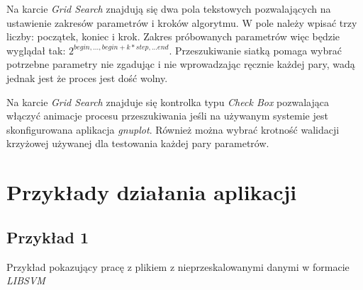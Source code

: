 \documentclass[paper=a4, fontsize=11pt]{scrartcl} %
\numberwithin{equation}{section} %
\numberwithin{figure}{section} %
\begin{document}
    \par Na karcie \textit{Grid Search} znajdują się dwa pola tekstowych pozwalających na ustawienie
    zakresów parametrów i kroków algorytmu. W pole należy wpisać trzy liczby: początek, koniec
    i krok. Zakres próbowanych parametrów więc będzie wyglądał tak:
    $2^{begin,...,begin+k*step,...end}$. Przeszukiwanie siatką pomaga wybrać potrzebne
    parametry nie zgadując i nie wprowadzając ręcznie każdej pary, wadą jednak jest że proces
    jest dość wolny. 
    \par Na karcie \textit{Grid Search} znajduje się kontrolka typu \textit{Check Box}
    pozwalająca włączyć animacje procesu przeszukiwania jeśli na używanym systemie jest
    skonfigurowana aplikacja \textit{gnuplot}. Również można wybrać krotność walidacji
    krzyżowej używanej dla testowania każdej pary parametrów. 

\newpage
\section{Przykłady działania aplikacji}
\subsection{Przykład 1}
    \par Przykład pokazujący pracę z plikiem z nieprzeskalowanymi danymi w formacie
    \textit{LIBSVM}
\end{document}
